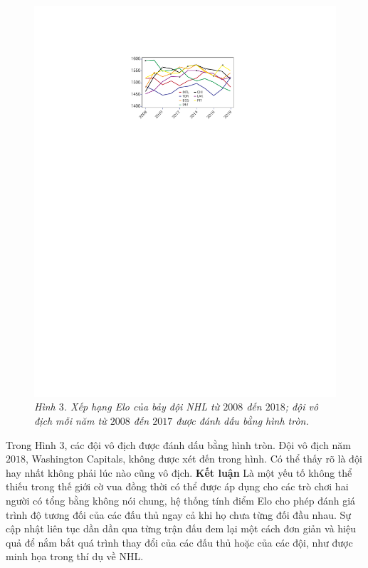 \begin{multicols}{2}
\begin{figure}[H]
		\includegraphics[width= 1\linewidth]{pic4}
		\caption{\small\textit{\color{toanhocdoisong}Hình $3$. Xếp hạng Elo của bảy đội NHL từ $2008$ đến $2018$; đội vô địch mỗi năm từ $2008$ đến $2017$ được đánh dấu bằng hình tròn.}}
		\vspace*{-10pt}
	\end{figure}
	Trong Hình $3$, các đội vô địch được đánh dấu bằng hình tròn. Đội vô địch năm $2018$, Washington Capitals, không được xét đến trong hình. Có thể thấy rõ là đội hay nhất không phải lúc nào cũng vô địch.
	\vskip 0.05cm
	\textbf{\color{toanhocdoisong}Kết luận}
	\vskip 0.05cm
	Là một yếu tố không thể thiếu trong thế giới cờ vua đồng thời có thể được áp dụng cho các trò chơi hai người có tổng bằng không nói chung, hệ thống tính điểm Elo cho phép đánh giá trình độ tương đối của các đấu thủ ngay cả khi họ chưa từng đối đầu nhau. Sự cập nhật liên tục dần dần qua từng trận đấu đem lại một cách đơn giản và hiệu quả để nắm bắt quá trình thay đổi của các đấu thủ hoặc của các đội, như được minh họa trong thí dụ về NHL.

\end{multicols}
